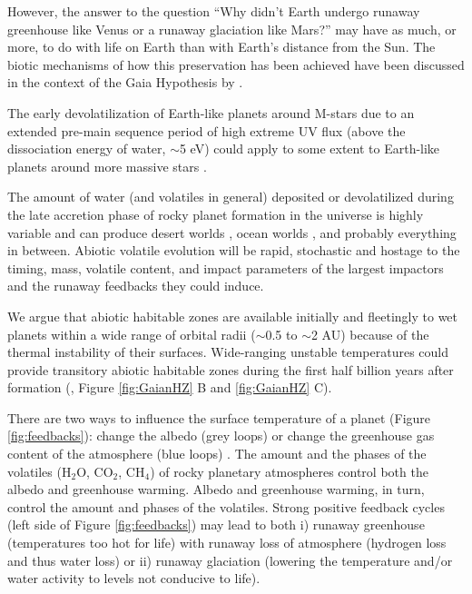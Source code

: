 However, the answer to the question ``Why didn't Earth undergo runaway greenhouse like Venus or a runaway glaciation like Mars?'' may have as much, or more, to do with life on Earth than with Earth's distance from the Sun.
The biotic mechanisms of how this preservation has been achieved have been discussed in the context of the Gaia Hypothesis by \citet{Harding2010}.

The early devolatilization of Earth-like planets around M-stars due to an extended pre-main sequence period of high extreme UV flux (above the dissociation energy of water, $\sim$5 eV)  could apply to some extent to Earth-like planets around more massive stars \citep{Luger2015,Tian2015}.

The amount of water (and volatiles in general) deposited or devolatilized during the late accretion phase of rocky planet formation in the universe is highly variable \citep{Raymond2004,Raymond2009} and can produce desert worlds \citep{Abe2011}, ocean worlds \citep{Leger2004}, and probably everything in between. Abiotic volatile evolution will be rapid, stochastic and hostage to the timing, mass, volatile content, and impact parameters of the largest impactors and the runaway feedbacks they could induce.

We argue that abiotic habitable zones are available initially and fleetingly to wet planets within a wide range of orbital radii ($\sim$0.5 to $\sim$2 AU) because of the thermal instability of their surfaces. Wide-ranging unstable temperatures could provide transitory abiotic habitable zones during the first half billion years after formation (\citet{Nisbet2002}, Figure \ref{fig:GaianHZ} B and \ref{fig:GaianHZ} C).

There are two ways to influence the surface temperature of a planet (Figure \ref{fig:feedbacks}): change the albedo (grey loops)  or  change the greenhouse gas content of the atmosphere (blue loops) \citep{Kasting2012}.
The amount and the phases of the volatiles (H$_{2}$O, CO$_{2}$, CH$_{4}$) of rocky planetary atmospheres control both the albedo and greenhouse warming.
Albedo and greenhouse warming, in turn, control the amount and phases of the volatiles. Strong positive feedback cycles (left side of Figure \ref{fig:feedbacks})  may lead to both i) runaway greenhouse (temperatures too hot for
life) with runaway loss of atmosphere (hydrogen loss and thus water loss) or ii) runaway glaciation (lowering the temperature and/or water activity to levels not conducive to life).

